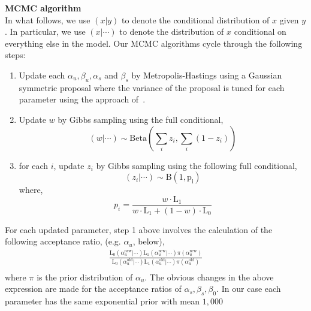 \documentclass{article}
\begin{document}
\noindent\textbf{MCMC algorithm}\\
In what follows, we use $(x|y)$ to denote the conditional distribution of $x$ given $y$. In particular, we use $(x|\cdots)$ to denote the distribution of $x$ conditional on everything else in the model. Our MCMC algorithms cycle through the following steps: 
\begin{enumerate}
\item Update each $\alpha_u, \beta_u, \alpha_s$ and $\beta_s$ by Metropolis-Hastings using a Gaussian symmetric proposal where the variance of the proposal is tuned for each parameter using the approach of~\cite{Gelman:2004tc,Raftery:1992vp,Raftery:1996ws}.
\item Update $w$ by Gibbs sampling using the full conditional,
\[
(w|\cdots)\sim \mathrm{Beta}(\sum_i z_i,\sum_i (1-z_i))
\]
\item for each $i$, update $z_i$ by Gibbs sampling using the following full conditional,
\[
(z_i|\cdots)\sim\mathrm{B(1,p_i)}
\]
where,
\[
p_i=\frac{w\cdot\mathrm{L_1}}{w\cdot\mathrm{L_1}+(1-w)\cdot\mathrm{L_0}}
\]
\end{enumerate}
For each updated parameter, step 1 above involves the calculation of the following acceptance ratio, (e.g. $\alpha_u$, below),
\[
\begin{split}
\frac{\mathrm{L_0}(\alpha^{\text{new}}_u|\cdots)\mathrm{L_1}(\alpha^{\text{new}}_u|\cdots)\pi(\alpha^{\text{new}}_u)}{\mathrm{L_0}(\alpha^{\text{old}}_u|\cdots)\mathrm{L_1}(\alpha^{\text{old}}_u|\cdots)\pi(\alpha^{\text{old}}_u)}\\
\end{split}
\]
where $\pi$ is the prior distribution of $\alpha_u$. The obvious changes in the above expression are made for the acceptance ratios of $\alpha_s,\beta_s,\beta_0$. In our case each parameter has the same exponential prior with mean $1,000$
\end{document}
